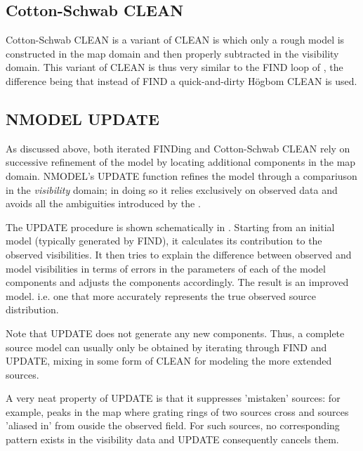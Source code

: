 \subsection{ Cotton-Schwab CLEAN }
\label{.cotton}

	Cotton-Schwab CLEAN is a variant of CLEAN is which only a rough model
is constructed in the map domain and then properly subtracted in the visibility
domain. This variant of CLEAN is thus very similar to the FIND loop of
, the difference being that instead of FIND a
quick-and-dirty H\"ogbom CLEAN is used.


\subsection{ NMODEL UPDATE }
\label{.nmodel.update}



	As discussed above, both iterated FINDing and Cotton-Schwab CLEAN rely
on successive refinement of the model by locating additional components in the
map domain. NMODEL's UPDATE function refines the model through a compariuson in
the {\em visibility} domain; in doing so it relies exclusively on observed data
and avoids all the ambiguities introduced by the .

	The UPDATE procedure is shown schematically in .
Starting from an initial model (typically generated by FIND), it calculates its
contribution to the observed visibilities. It then tries to explain the
difference between observed and model visibilities in terms of errors in the
parameters of each of the model components and adjusts the components
accordingly. The result is an improved model. i.e. one that more accurately
represents the true observed source distribution.

	Note that UPDATE does not generate any new components. Thus, a complete
source model can usually only be obtained by iterating through FIND and UPDATE,
mixing in some form of CLEAN for modeling the more extended sources.

	A very neat property of UPDATE is that it suppresses 'mistaken'
sources: for example, peaks in the map where grating rings of two sources cross
and sources 'aliased in' from ouside the observed field. For such sources, no
corresponding pattern exists in the visibility data and UPDATE consequently
cancels them.
